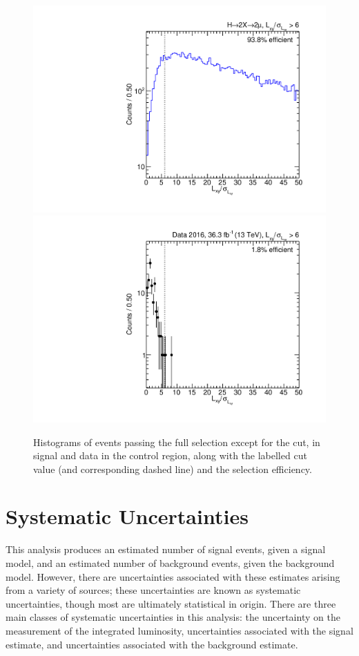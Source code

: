 \begin{figure}[p]
  \centering
  \includegraphics[width=\DSquareWidth]{figures/displaced/NM1_2Mu2J_LxySig.pdf}
  \hspace*{-2em}
  \includegraphics[width=\DSquareWidth]{figures/displaced/NM1_Data_LxySig.pdf}
  \caption[Histograms of events passing the full selection except for the \LxySig cut in \twoMu signal and data.]{Histograms of events passing the full selection except for the \LxySig cut, in  \twoMu signal and  data in the control region, along with the labelled cut value (and corresponding dashed line) and the selection efficiency.}
  \label{fig:dd:NM1_LxySig}
\end{figure}

\section{Systematic Uncertainties}
This analysis produces an estimated number of signal events, given a signal model, and an estimated number of background events, given the background model.
However, there are uncertainties associated with these estimates arising from a variety of sources; these uncertainties are known as systematic uncertainties, though most are ultimately statistical in origin.
There are three main classes of systematic uncertainties in this analysis: the uncertainty on the measurement of the integrated luminosity, uncertainties associated with the signal estimate, and uncertainties associated with the background estimate.

